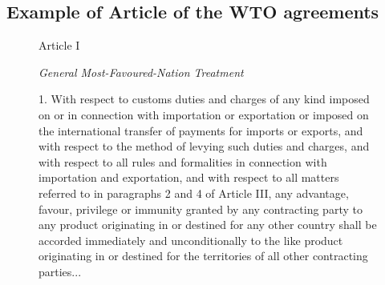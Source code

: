 \documentclass[12pt,letterpaper]{article}
\begin{document}
\begin{appendices}
  \subsection{Example of Article of the WTO agreements}
  \label{fig:gatt_art1}
\begin{figure}[h]
    \begin{center}
        Article I
    \end{center}
    \begin{center}
        \textit{General Most-Favoured-Nation Treatment}
    \end{center}
    1. With respect to customs duties and charges of any kind imposed on or in connection
    with importation or exportation or imposed on the international transfer of payments for
    imports or exports, and with respect to the method of levying such duties and charges, and
    with respect to all rules and formalities in connection with importation and exportation, and
    with respect to all matters referred to in paragraphs 2 and 4 of Article III, any advantage,
    favour, privilege or immunity granted by any contracting party to any product originating in
    or destined for any other country shall be accorded immediately and unconditionally to the
    like product originating in or destined for the territories of all other contracting parties...
\end{figure}



  


\end{appendices}
\end{document}
